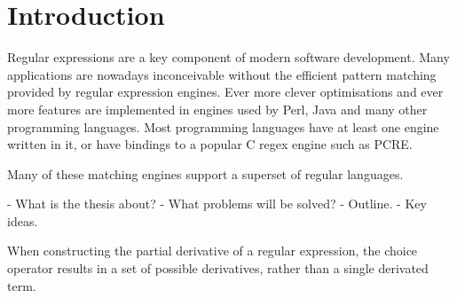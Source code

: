 \chapter{Introduction}

Regular expressions are a key component of modern software development. Many
applications are nowadays inconceivable without the efficient pattern matching
provided by regular expression engines. Ever more clever optimisations and ever
more features are implemented in engines used by Perl, Java and many other
programming languages. Most programming languages have at least one engine
written in it, or have bindings to a popular C regex engine such as PCRE.

Many of these matching engines support a superset of regular languages.

- What is the thesis about?
- What problems will be solved?
- Outline.
- Key ideas.

When constructing the partial derivative of a regular expression, the choice
operator results in a set of possible derivatives, rather than a single
derivated term.


